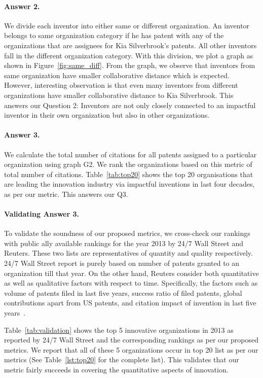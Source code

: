 \paragraph{Answer 2.}
We divide each inventor into either same 
or different organization. An inventor belongs to 
 same organization category if he has patent with any of the organizations that are 
assignees for Kia Silverbrook's patents. All other inventors fall in the different
organization category. With this division, we plot a graph as shown in Figure~\ref{fig:same_diff}.
From the graph, we observe that inventors from same organization have
smaller collaborative distance which is expected. However, interesting observation is that
even many inventors from different organizations have smaller collaborative distance to Kia Silverbrook. 
This answers our Question 2:
Inventors are not only closely connected to an impactful
inventor in their own organization but also in other organizations.

\paragraph{Answer 3.}
We calculate the total number of citations for all patents assigned to a particular organization using graph G2. We rank the organizations based on this metric of total number of citations. Table~\ref{tab:top20} shows the top 20 organisations that are leading the innovation industry via impactful inventions in last four decades, as per our metric. 
This answers our Q3. 

\paragraph{Validating Answer 3.}
To validate the soundness of our proposed metrics, we cross-check our rankings
with public ally available rankings for the year 2013 by 24/7 Wall Street and
Reuters. These two lists are representatives of quantity and quality
respectively.  24/7 Wall Street report is purely based on number of patents
granted to an organization till that year.  On the other hand, Reuters
consider both quantitative as well as qualitative factors with respect to
time. Specifically, the factors such as volume of patents filed in last five
years, success ratio of filed patents, global contributions apart from US
patents, and citation impact of invention in last five years~\cite{reuters-method}.

Table~\ref{tab:validation} shows the top 5 innovative organizations in 2013 as
reported by 24/7 Wall Street and the corresponding rankings as per our
proposed metrics. We report that all of these 5 organizations occur in top 20
list as per our metrics (See Table~\ref{lst:top20} for the complete list).
This validates that our metric fairly succeeds in covering the quantitative
aspects of innovation.

